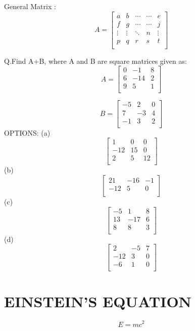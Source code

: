 \documentclass{article}
\begin{document}
General Matrix : 
\[A=
\begin{bmatrix}
	a & b & \cdots & \cdots & e\\
	f & g & \cdots & \cdots & j\\
	\vdots & \vdots & \ddots & n & \vdots\\
	p & q & r & s & t\\
\end{bmatrix}
\]

Q.Find A+B, where A and B are square matrices given as:
\[A=
\begin{bmatrix}
        0 & -1 & 8\\
        6 & -14 & 2\\
        9 & 5 & 1\\
\end{bmatrix}
\]


\[B=
\begin{bmatrix}
	-5 & 2 & 0\\
	7 & -3 & 4\\
	-1 & 3 &2\\
\end{bmatrix}
\]
OPTIONS:
(a) 
\[
	\begin{bmatrix}
		1 & 0 & 0\\
		-12 & 15 & 0\\
		2 & 5 & 12\\
	\end{bmatrix}
\]
(b)
\[
        \begin{bmatrix}
		21 & -16 & -1\\
		-12 & 5 & 0\\  
        \end{bmatrix}
\]
(c)
\[
        \begin{bmatrix}
		-5 & 1 & 8\\
		13 & -17 & 6\\
		8 & 8 & 3\\
        \end{bmatrix}
\]
(d)
\[
        \begin{bmatrix}
		2 & -5 & 7\\
		-12 & 3 & 0\\
		-6 & 1 & 0\\
        \end{bmatrix}
\]

\section{EINSTEIN'S EQUATION}
\begin{equation}
	E=mc^2
\end{equation}
\end{document}
